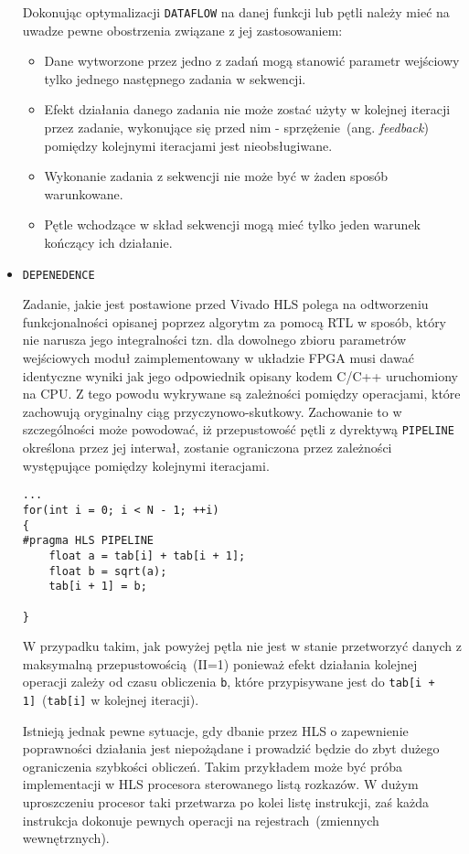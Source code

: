 \begin{itemize}
Dokonując optymalizacji \texttt{DATAFLOW} na danej funkcji lub pętli należy mieć na uwadze pewne obostrzenia związane z jej zastosowaniem:
\begin{itemize}
\item Dane wytworzone przez jedno z zadań mogą stanowić parametr wejściowy tylko jednego następnego zadania w sekwencji.
\item Efekt działania danego zadania nie może zostać użyty w kolejnej iteracji przez zadanie, wykonujące się przed nim - sprzężenie~(ang. \textit{feedback}) pomiędzy kolejnymi iteracjami jest nieobsługiwane. 
\item Wykonanie zadania z sekwencji nie może być w żaden sposób warunkowane.
\item Pętle wchodzące w skład sekwencji mogą mieć tylko jeden warunek kończący ich działanie.
\end{itemize}

\item \texttt{DEPENEDENCE}

Zadanie, jakie jest postawione przed Vivado HLS polega na odtworzeniu funkcjonalności opisanej poprzez algorytm za pomocą RTL w sposób, który nie narusza jego integralności tzn. dla dowolnego zbioru parametrów wejściowych moduł zaimplementowany w układzie FPGA musi dawać identyczne wyniki jak jego odpowiednik opisany kodem C/C++ uruchomiony na CPU. Z tego powodu wykrywane są zależności pomiędzy operacjami, które zachowują oryginalny ciąg przyczynowo-skutkowy. Zachowanie to w szczególności może powodować, iż przepustowość pętli z dyrektywą \texttt{PIPELINE} określona przez jej interwał, zostanie ograniczona przez zależności występujące pomiędzy kolejnymi iteracjami.

\begin{lstlisting}[caption=Zależność interwału pętli od występujących zależności pomiędzy kolejnymi iteracjami]
...
for(int i = 0; i < N - 1; ++i)
{
#pragma HLS PIPELINE
	float a = tab[i] + tab[i + 1];
	float b = sqrt(a);
	tab[i + 1] = b;
	
}
\end{lstlisting}
W przypadku takim, jak powyżej pętla nie jest w stanie przetworzyć danych z maksymalną przepustowością~(II=1) ponieważ efekt działania kolejnej operacji zależy od czasu obliczenia \texttt{b}, które przypisywane jest do \texttt{tab[i + 1]}~(\texttt{tab[i]} w kolejnej iteracji). 

Istnieją jednak pewne sytuacje, gdy dbanie przez HLS o zapewnienie poprawności działania jest niepożądane i prowadzić będzie do zbyt dużego ograniczenia szybkości obliczeń. Takim przykładem może być próba implementacji w HLS procesora sterowanego listą rozkazów. W dużym uproszczeniu procesor taki przetwarza po kolei listę instrukcji, zaś każda instrukcja dokonuje pewnych operacji na rejestrach~(zmiennych wewnętrznych). 


\end{itemize}
